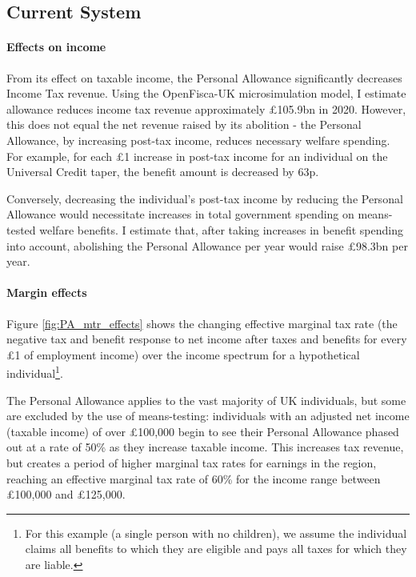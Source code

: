 \documentclass{article}
\begin{document}
    \subsection{Current System}

    \paragraph{Effects on income}

    From its effect on taxable income, the Personal Allowance significantly decreases Income Tax revenue. Using the OpenFisca-UK microsimulation model, I estimate allowance reduces income tax revenue approximately £105.9bn in 2020. However, this does not equal the net revenue raised by its abolition - the Personal Allowance, by increasing post-tax income, reduces necessary welfare spending. For example, for each £1 increase in post-tax income for an individual on the Universal Credit taper, the benefit amount is decreased by 63p. 
    
    Conversely, decreasing the individual's post-tax income by reducing the Personal Allowance would necessitate increases in total government spending on means-tested welfare benefits. I estimate that, after taking increases in benefit spending into account, abolishing the Personal Allowance per year would raise £98.3bn per year.
    
    \paragraph{Margin effects} Figure \ref{fig:PA_mtr_effects} shows the changing effective marginal tax rate (the negative tax and benefit response to net income after taxes and benefits for every £1 of employment income) over the income spectrum for a hypothetical individual\footnote{For this example (a single person with no children), we assume the individual claims all benefits to which they are eligible and pays all taxes for which they are liable.}. 
    
    The Personal Allowance applies to the vast majority of UK individuals, but some are excluded by the use of means-testing: individuals with an adjusted net income (taxable income) of over £100,000 begin to see their Personal Allowance phased out at a rate of 50\% as they increase taxable income. This increases tax revenue, but creates a period of higher marginal tax rates for earnings in the region, reaching an effective marginal tax rate of 60\% for the income range between £100,000 and £125,000.
\end{document}
